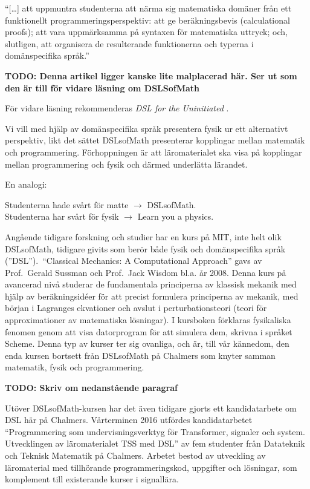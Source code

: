 \begin{draft}
\begin{center} ``[\dots] att uppmuntra studenterna att närma sig matematiska
  domäner från ett funktionellt programmeringsperspektiv: att ge beräkningsbevis
  (calculational proofs); att vara uppmärksamma på syntaxen för matematiska
  uttryck; och, slutligen, att organisera de resulterande funktionerna och
typerna i domänspecifika språk.''\cite{lecture-notes}\cite{tfpie2015}
\end{center}

\textbf{TODO: Denna artikel ligger kanske lite malplacerad här. Ser ut som den
är till för vidare läsning om DSLSofMath}

För vidare läsning rekommenderas \textit{DSL for the Uninitiated} \cite{DSLU}. 

Vi vill med hjälp av domänspecifika språk presentera fysik ur ett alternativt
perspektiv, likt det sättet DSLsofMath presenterar kopplingar mellan matematik
och programmering. Förhoppningen är att läromaterialet ska visa på kopplingar
mellan programmering och fysik och därmed underlätta lärandet.

En analogi:

Studenterna hade svårt för matte $\rightarrow $ DSLsofMath.\\ Studenterna har
svårt för fysik $\rightarrow $ Learn you a physics.

Angående tidigare forskning och studier har en kurs på MIT, inte helt olik
DSLsofMath, tidigare givits som berör både fysik och domänspecifika språk
(''DSL'').\ ``Classical Mechanics: A Computational Approach'' gavs av Prof.\
Gerald Sussman och Prof.\ Jack Wisdom bl.a. år
2008.\cite{classical-mechanics-course-mit-2008} Denna kurs på avancerad nivå
studerar de fundamentala principerna av klassisk mekanik med hjälp av
beräkningsidéer för att precist formulera principerna av mekanik, med början i
Lagranges ekvationer och avslut i perturbationsteori (teori för approximationer
av matematiska lösningar). I kursboken\cite{SICM} förklaras fysikaliska fenomen
genom att visa datorprogram för att simulera dem, skrivna i språket Scheme.
Denna typ av kurser ter sig ovanliga, och är, till vår kännedom, den enda kursen
bortsett från DSLsofMath på Chalmers som knyter samman matematik, fysik och
programmering.

\textbf{TODO: Skriv om nedanstående paragraf}

Utöver DSLsofMath-kursen har det även tidigare gjorts ett kandidatarbete om DSL
här på Chalmers. Vårterminen 2016 utfördes kandidatarbetet ``Programmering som
undervisningsverktyg för Transformer, signaler och system. Utvecklingen av
läromaterialet TSS med DSL'' av fem studenter från Datateknik och Teknisk
Matematik på Chalmers. Arbetet bestod av utveckling av läromaterial med
tillhörande programmeringskod, uppgifter och lösningar, som komplement till
existerande kurser i signallära.\cite{kandidat2016} \end{draft}

